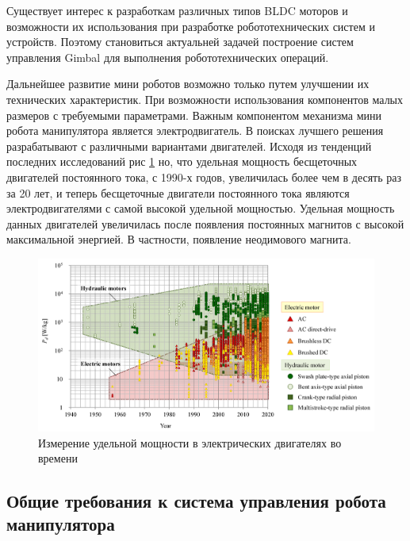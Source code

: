 Существует интерес к разработкам различных типов BLDC моторов и возможности их использования при разработке робототехнических систем и устройств. Поэтому становиться актуальней задачей построение систем управления Gimbal для выполнения робототехнических операций.




Дальнейшее развитие мини роботов возможно только путем улучшении  их технических характеристик. При возможности использования компонентов малых размеров с требуемыми параметрами. Важным компонентом механизма мини робота манипулятора является электродвигатель. В поисках лучшего решения разрабатывают с различными вариантами двигателей. Исходя из тенденций последних исследований \citep{Sakama2022} рис \ref{magnets} но, что удельная мощность бесщеточных двигателей постоянного тока, с 1990-х годов, увеличилась более чем в десять раз за 20 лет, и теперь бесщеточные двигатели постоянного тока являются электродвигателями с самой высокой удельной мощностью. Удельная мощность данных двигателей увеличилась после появления постоянных магнитов с высокой максимальной энергией. В частности, появление неодимового магнита.

\begin{figure}[H]
	\centering
	\includegraphics[width=\textwidth]{Src/images/magnets.png}
	\caption{Измерение удельной мощности в электрических двигателях во времени \citep{Sakama2022}}
	\label{magnets}
\end{figure}

\subsection{ Общие требования к система управления робота манипулятора}

